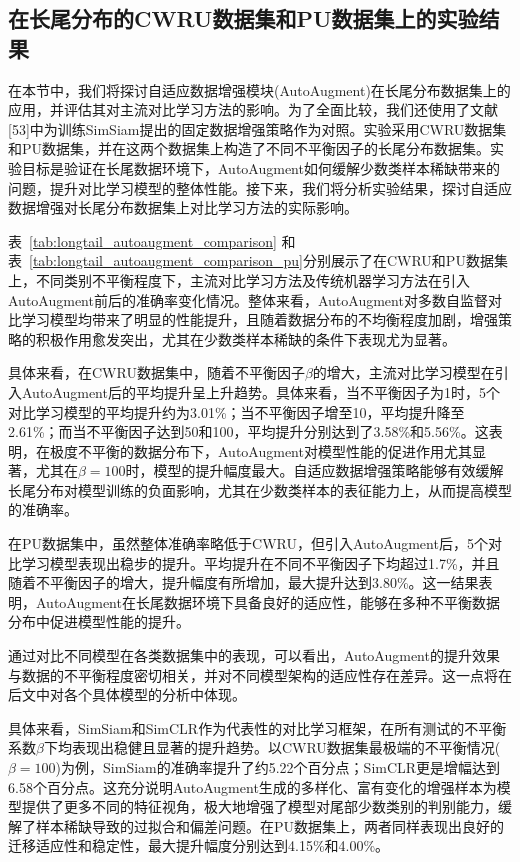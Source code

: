 \documentclass[master]{thesis-uestc}
\begin{document}
\FloatBarrier  %

\subsection{在长尾分布的CWRU数据集和PU数据集上的实验结果}
在本节中，我们将探讨自适应数据增强模块(AutoAugment)在长尾分布数据集上的应用，并评估其对主流对比学习方法的影响。为了全面比较，我们还使用了文献[53]中为训练SimSiam提出的固定数据增强策略作为对照。实验采用CWRU数据集和PU数据集，并在这两个数据集上构造了不同不平衡因子的长尾分布数据集。实验目标是验证在长尾数据环境下，AutoAugment如何缓解少数类样本稀缺带来的问题，提升对比学习模型的整体性能。接下来，我们将分析实验结果，探讨自适应数据增强对长尾分布数据集上对比学习方法的实际影响。

表~\ref{tab:longtail_autoaugment_comparison} 和表~\ref{tab:longtail_autoaugment_comparison_pu}分别展示了在CWRU和PU数据集上，不同类别不平衡程度下，主流对比学习方法及传统机器学习方法在引入AutoAugment前后的准确率变化情况。整体来看，AutoAugment对多数自监督对比学习模型均带来了明显的性能提升，且随着数据分布的不均衡程度加剧，增强策略的积极作用愈发突出，尤其在少数类样本稀缺的条件下表现尤为显著。

具体来看，在CWRU数据集中，随着不平衡因子$\beta$的增大，主流对比学习模型在引入AutoAugment后的平均提升呈上升趋势。具体来看，当不平衡因子为1时，5个对比学习模型的平均提升约为3.01\%；当不平衡因子增至10，平均提升降至2.61\%；而当不平衡因子达到50和100，平均提升分别达到了3.58\%和5.56\%。这表明，在极度不平衡的数据分布下，AutoAugment对模型性能的促进作用尤其显著，尤其在$\beta=100$时，模型的提升幅度最大。自适应数据增强策略能够有效缓解长尾分布对模型训练的负面影响，尤其在少数类样本的表征能力上，从而提高模型的准确率。

在PU数据集中，虽然整体准确率略低于CWRU，但引入AutoAugment后，5个对比学习模型表现出稳步的提升。平均提升在不同不平衡因子下均超过1.7\%，并且随着不平衡因子的增大，提升幅度有所增加，最大提升达到3.80\%。这一结果表明，AutoAugment在长尾数据环境下具备良好的适应性，能够在多种不平衡数据分布中促进模型性能的提升。

通过对比不同模型在各类数据集中的表现，可以看出，AutoAugment的提升效果与数据的不平衡程度密切相关，并对不同模型架构的适应性存在差异。这一点将在后文中对各个具体模型的分析中体现。

具体来看，SimSiam和SimCLR作为代表性的对比学习框架，在所有测试的不平衡系数$\beta$下均表现出稳健且显著的提升趋势。以CWRU数据集最极端的不平衡情况($\beta=100$)为例，SimSiam的准确率提升了约5.22个百分点；SimCLR更是增幅达到6.58个百分点。这充分说明AutoAugment生成的多样化、富有变化的增强样本为模型提供了更多不同的特征视角，极大地增强了模型对尾部少数类别的判别能力，缓解了样本稀缺导致的过拟合和偏差问题。在PU数据集上，两者同样表现出良好的迁移适应性和稳定性，最大提升幅度分别达到4.15\%和4.00\%。
\end{document}
